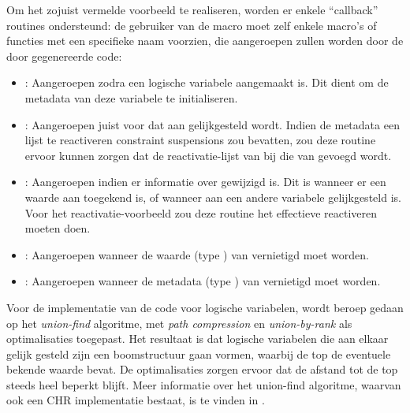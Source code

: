 Om het zojuist vermelde voorbeeld te realiseren, worden er enkele ``callback'' routines ondersteund: de gebruiker van de  macro moet zelf enkele macro's of functies met een specifieke naam voorzien, die aangeroepen zullen worden door de door  gegenereerde code: \begin{itemize}
  \item {}: Aangeroepen zodra een logische variabele  aangemaakt is. Dit dient om de metadata van deze variabele te initialiseren.
  \item {}: Aangeroepen juist voor dat  aan  gelijkgesteld wordt. Indien de metadata een lijst te reactiveren constraint suspensions zou bevatten, zou deze routine ervoor kunnen zorgen dat de reactivatie-lijst van  bij die van  gevoegd wordt.
  \item {}: Aangeroepen indien er informatie over  gewijzigd is. Dit is wanneer er een waarde aan toegekend is, of wanneer  aan een andere variabele gelijkgesteld is. Voor het reactivatie-voorbeeld zou deze routine het effectieve reactiveren moeten doen.
  \item {}: Aangeroepen wanneer de waarde (type ) van  vernietigd moet worden.
  \item {}: Aangeroepen wanneer de metadata (type ) van  vernietigd moet worden.
\end{itemize}

Voor de implementatie van de code voor logische variabelen, wordt beroep gedaan op het {\em union-find} algoritme, met {\em path compression} en {\em union-by-rank} als optimalisaties toegepast. Het resultaat is dat logische variabelen die aan elkaar gelijk gesteld zijn een boomstructuur gaan vormen, waarbij de top de eventuele bekende waarde bevat. De optimalisaties zorgen ervoor dat de afstand tot de top steeds heel beperkt blijft. Meer informatie over het union-find algoritme, waarvan ook een CHR implementatie bestaat, is te vinden in \cite{tom:unionfind:techreport}.

